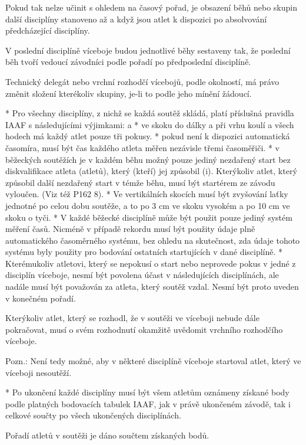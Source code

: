 Pokud tak nelze učinit s ohledem na časový pořad, je obsazení běhů nebo skupin další disciplíny stanoveno až a když jsou atlet k dispozici po absolvování předcházející disciplíny.

V poslední disciplíně víceboje budou jednotlivé běhy sestaveny tak, že poslední běh tvoří vedoucí závodníci podle pořadí po předposlední disciplíně.

Technický delegát nebo vrchní rozhodčí vícebojů, podle okolností, má právo změnit složení kterékoliv skupiny, je-li to podle jeho mínění žádoucí.

* Pro všechny disciplíny, z nichž se každá soutěž skládá, platí příslušná pravidla IAAF s následujícími výjimkami:
  \begitems \style a
  * ve skoku do dálky a při vrhu koulí a všech hodech má každý atlet pouze tři pokusy.
  * pokud není k dispozici automatická časomíra, musí být čas každého atleta měřen nezávisle třemi časoměřiči.
  * v běžeckých soutěžích je v každém běhu možný pouze jediný nezdařený start bez diskvalifikace atleta (atletů), který (kteří) jej způsobil (i). Kterýkoliv atlet, který způsobil další nezdařený start v témže běhu, musí být startérem ze závodu vyloučen. (Viz též P162 8).
  * Ve vertikálních skocích musí být zvyšování laťky jednotné po celou dobu soutěže, a to po 3 cm ve skoku vysokém a po 10 cm ve skoku o tyči.
  \enditems
* V každé běžecké disciplíně může být použit pouze jediný systém měření časů. Nicméně v případě rekordu musí být použity údaje plně automatického časoměrného systému, bez ohledu na skutečnost, zda údaje tohoto systému byly použity pro bodování ostatních startujících v dané disciplíně.
* Kterémukoliv atletovi, který se nepokusí o start nebo neprovede pokus v jedné z disciplín víceboje, nesmí být povolena účast v následujících disciplínách, ale nadále musí být považován za atleta, který soutěž vzdal. Nesmí být proto uveden v konečném pořadí.

Kterýkoliv atlet, který se rozhodl, že v soutěži ve víceboji nebude dále pokračovat, musí o svém rozhodnutí okamžitě uvědomit vrchního rozhodčího víceboje.

Pozn.: Není tedy možné, aby v některé disciplíně víceboje startoval atlet, který ve víceboji nesoutěží.

* Po ukončení každé disciplíny musí být všem atletům oznámeny získané body podle platných bodovacích tabulek IAAF, jak v právě ukončeném závodě, tak i celkové součty po všech ukončených disciplínách.

Pořadí atletů v soutěži je dáno součtem získaných bodů.


